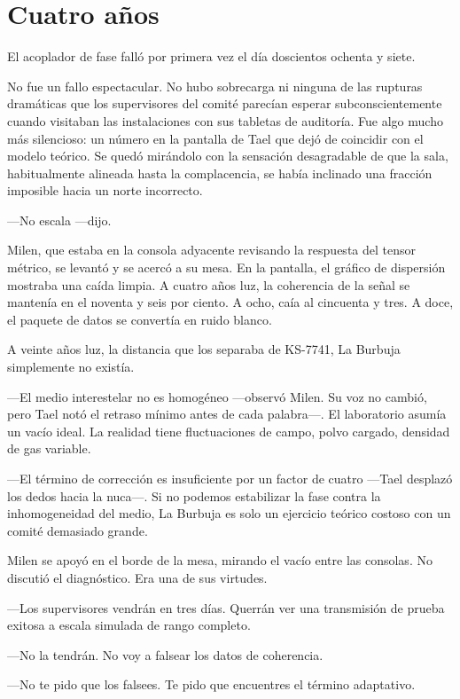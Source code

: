 \documentclass[11pt,a5paper,twoside]{book}
\begin{document}
\chapter{Cuatro años}

El acoplador de fase falló por primera vez el día doscientos ochenta y siete.

No fue un fallo espectacular. No hubo sobrecarga ni ninguna de las rupturas dramáticas que los supervisores del comité parecían esperar subconscientemente cuando visitaban las instalaciones con sus tabletas de auditoría. Fue algo mucho más silencioso: un número en la pantalla de Tael que dejó de coincidir con el modelo teórico. Se quedó mirándolo con la sensación desagradable de que la sala, habitualmente alineada hasta la complacencia, se había inclinado una fracción imposible hacia un norte incorrecto.

—No escala —dijo.

Milen, que estaba en la consola adyacente revisando la respuesta del tensor métrico, se levantó y se acercó a su mesa. En la pantalla, el gráfico de dispersión mostraba una caída limpia. A cuatro años luz, la coherencia de la señal se mantenía en el noventa y seis por ciento. A ocho, caía al cincuenta y tres. A doce, el paquete de datos se convertía en ruido blanco.

A veinte años luz, la distancia que los separaba de KS-7741, La Burbuja simplemente no existía.

—El medio interestelar no es homogéneo —observó Milen. Su voz no cambió, pero Tael notó el retraso mínimo antes de cada palabra—. El laboratorio asumía un vacío ideal. La realidad tiene fluctuaciones de campo, polvo cargado, densidad de gas variable.

—El término de corrección es insuficiente por un factor de cuatro —Tael desplazó los dedos hacia la nuca—. Si no podemos estabilizar la fase contra la inhomogeneidad del medio, La Burbuja es solo un ejercicio teórico costoso con un comité demasiado grande.

Milen se apoyó en el borde de la mesa, mirando el vacío entre las consolas. No discutió el diagnóstico. Era una de sus virtudes.

—Los supervisores vendrán en tres días. Querrán ver una transmisión de prueba exitosa a escala simulada de rango completo.

—No la tendrán. No voy a falsear los datos de coherencia.

—No te pido que los falsees. Te pido que encuentres el término adaptativo.
\end{document}
